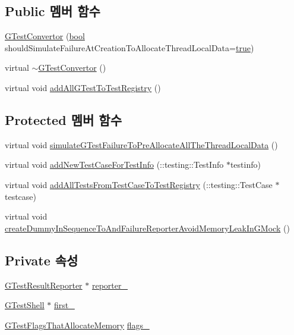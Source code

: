 \subsection*{Public 멤버 함수}
\begin{DoxyCompactItemize}
\item 
\hyperlink{class_g_test_convertor_a34ef17b0609e0eb684ee9a15fdd8c699}{G\+Test\+Convertor} (\hyperlink{avb__gptp_8h_af6a258d8f3ee5206d682d799316314b1}{bool} should\+Simulate\+Failure\+At\+Creation\+To\+Allocate\+Thread\+Local\+Data=\hyperlink{avb__gptp_8h_af6a258d8f3ee5206d682d799316314b1a08f175a5505a10b9ed657defeb050e4b}{true})
\item 
virtual \hyperlink{class_g_test_convertor_adec88a0327f5e1d5c16ac2c30b1e7a03}{$\sim$\+G\+Test\+Convertor} ()
\item 
virtual void \hyperlink{class_g_test_convertor_ab2d85457cc006bc2548ab982d0d27f55}{add\+All\+G\+Test\+To\+Test\+Registry} ()
\end{DoxyCompactItemize}
\subsection*{Protected 멤버 함수}
\begin{DoxyCompactItemize}
\item 
virtual void \hyperlink{class_g_test_convertor_a8718e883d32eef7058c8e67fb5bddafd}{simulate\+G\+Test\+Failure\+To\+Pre\+Allocate\+All\+The\+Thread\+Local\+Data} ()
\item 
virtual void \hyperlink{class_g_test_convertor_a5907d646cd90f9acf3037f7774e5b45f}{add\+New\+Test\+Case\+For\+Test\+Info} (\+::testing\+::\+Test\+Info $\ast$testinfo)
\item 
virtual void \hyperlink{class_g_test_convertor_a802fe3256fea081bee7e5d03c4b6343c}{add\+All\+Tests\+From\+Test\+Case\+To\+Test\+Registry} (\+::testing\+::\+Test\+Case $\ast$testcase)
\item 
virtual void \hyperlink{class_g_test_convertor_aefacb5d39f829970a9288a5d3d6afb55}{create\+Dummy\+In\+Sequence\+To\+And\+Failure\+Reporter\+Avoid\+Memory\+Leak\+In\+G\+Mock} ()
\end{DoxyCompactItemize}
\subsection*{Private 속성}
\begin{DoxyCompactItemize}
\item 
\hyperlink{class_g_test_result_reporter}{G\+Test\+Result\+Reporter} $\ast$ \hyperlink{class_g_test_convertor_aaae29ad8be94f4d3878de73b594deac6}{reporter\+\_\+}
\item 
\hyperlink{class_g_test_shell}{G\+Test\+Shell} $\ast$ \hyperlink{class_g_test_convertor_a930ddc4a91132d6951461654933cd74c}{first\+\_\+}
\item 
\hyperlink{class_g_test_flags_that_allocate_memory}{G\+Test\+Flags\+That\+Allocate\+Memory} \hyperlink{class_g_test_convertor_a74ef936e2cd31159a036cf386411c9f1}{flags\+\_\+}
\end{DoxyCompactItemize}


